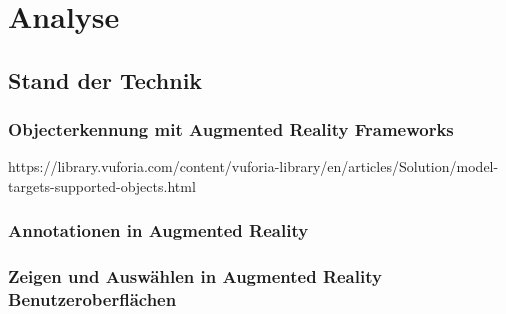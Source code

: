 \chapter{Analyse}

\section{Stand der Technik}

\subsection{Objecterkennung mit Augmented Reality Frameworks}

https://library.vuforia.com/content/vuforia-library/en/articles/Solution/model-targets-supported-objects.html


\subsection{Annotationen in Augmented Reality}

\subsection{Zeigen und Auswählen in Augmented Reality Benutzeroberflächen}

